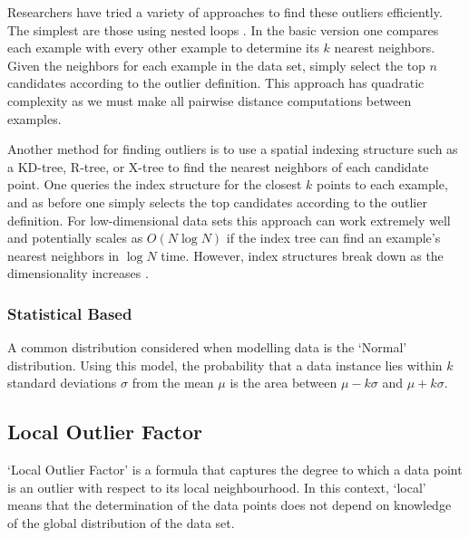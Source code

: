 Researchers have tried a variety of approaches to find these outliers
efficiently. The simplest are those using nested loops \cite{Bay:2003}. In the
basic version one compares each example with every other example to determine
its $k$ nearest neighbors. Given the neighbors for each example in the data set,
simply select the top $n$ candidates according to the outlier definition. This
approach has quadratic complexity as we must make all pairwise distance
computations between examples.

Another method for finding outliers is to use a spatial indexing structure such
as a KD-tree, R-tree, or X-tree to find the nearest neighbors of each candidate
point. One queries the index structure for the closest $k$ points to each
example, and as before one simply selects the top candidates according to the
outlier definition. For low-dimensional data sets this approach can work
extremely well and potentially scales as $O(N \log N)$ if the index tree can
find an example's nearest neighbors in $\log N$ time. However, index structures
break down as the dimensionality increases \cite{Bay:2003}.

\subsubsection{Statistical Based}
\label{anomalyDetection:approaches:statistical}
A common distribution considered when modelling data is the `Normal' 
distribution. Using this model, the probability that a data instance lies within
$k$ standard deviations $\sigma$ from the mean $\mu$ is the area between
$\mu - k\sigma$ and $\mu + k\sigma$.

\subsection{Local Outlier Factor}
\label{anomalyDetection:localOutlierFactor}
`Local Outlier Factor' is a formula that captures the degree to which a data
point is an outlier with respect to its local neighbourhood. In this context,
`local' means that the determination of the data points does not depend on
knowledge of the global distribution of the data set.
